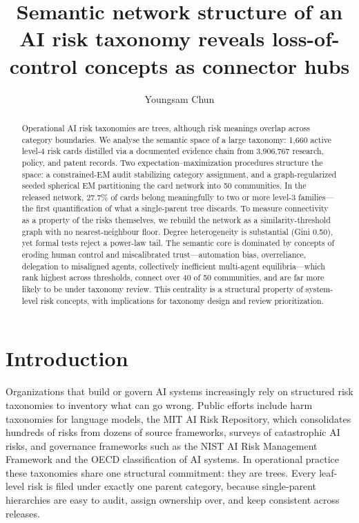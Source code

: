\documentclass[fleqn,10pt]{wlscirep}
\title{Semantic network structure of an AI risk taxonomy reveals loss-of-control concepts as connector hubs}
\author[1,2,*]{Youngsam Chun}
\affil[1]{Adjunct Professor, Ulsan National Institute of Science and Technology (UNIST), Ulsan, Republic of Korea}
\affil[2]{Frontier AI Lab, KT Corporation, Seoul, Republic of Korea}
\affil[*]{deep1003@snu.ac.kr; ORCID: \href{https://orcid.org/0000-0002-6877-6230}{0000-0002-6877-6230}}
\begin{document}
\sloppy
\raggedbottom

\begin{abstract}
Operational AI risk taxonomies are trees, although risk meanings overlap
across category boundaries. We analyse the
semantic space of a large taxonomy: 1,660 active level-4 risk
cards distilled via a documented evidence chain from 3,906,767 research,
policy, and patent records. Two expectation--maximization
procedures structure the space: a constrained-EM audit stabilizing category
assignment, and a graph-regularized seeded spherical EM partitioning the
card network into 50 communities. In the released network, 27.7\% of cards
belong meaningfully to two or more level-3 families---the first
quantification of what a single-parent tree discards. To measure connectivity as a
property of the risks themselves, we rebuild the network as a
similarity-threshold graph with no nearest-neighbour floor. Degree heterogeneity is substantial (Gini
0.50), yet formal tests reject a power-law tail. The semantic
core is dominated by concepts of eroding human control and miscalibrated
trust---automation bias, overreliance, delegation to misaligned agents,
collectively inefficient multi-agent equilibria---which rank highest across
thresholds, connect over 40 of 50 communities, and are far more likely to
be under taxonomy review. This centrality is a structural property of
system-level risk concepts, with implications for taxonomy design and
review prioritization.
\end{abstract}

\maketitle

\section*{Introduction}

Organizations that build or govern AI systems increasingly rely on structured
risk taxonomies to inventory what can go wrong. Public efforts include
harm taxonomies for language models\cite{weidinger2022}, the MIT AI Risk
Repository, which consolidates hundreds of risks from dozens of source
frameworks\cite{slattery2024}, surveys of catastrophic AI
risks\cite{hendrycks2023}, and governance frameworks such as the NIST AI Risk
Management Framework\cite{nist2023} and the OECD classification of AI
systems\cite{oecd2022}. In operational practice these taxonomies share one
structural commitment: they are trees. Every leaf-level risk is filed under
exactly one parent category, because single-parent hierarchies are easy to
audit, assign ownership over, and keep consistent across releases.
\end{document}
